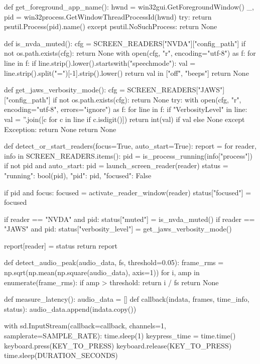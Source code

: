 \begin{pyverbatim}
def get_foreground_app_name():
    hwnd = win32gui.GetForegroundWindow()
    _, pid = win32process.GetWindowThreadProcessId(hwnd)
    try:
        return psutil.Process(pid).name()
    except psutil.NoSuchProcess:
        return None

def is_nvda_muted():
    cfg = SCREEN_READERS["NVDA"]["config_path"]
    if not os.path.exists(cfg):
        return None
    with open(cfg, "r", encoding="utf-8") as f:
        for line in f:
            if line.strip().lower().startswith("speechmode"):
                val = line.strip().split("=")[-1].strip().lower()
                return val in ["off", "beeps"]
    return None

def get_jaws_verbosity_mode():
    cfg = SCREEN_READERS["JAWS"]["config_path"]
    if not os.path.exists(cfg):
        return None
    try:
        with open(cfg, "r", encoding="utf-8", errors="ignore") as f:
            for line in f:
                if "VerbosityLevel" in line:
                    val = ''.join([c for c in line if c.isdigit()])
                    return int(val) if val else None
    except Exception:
        return None
    return None

def detect_or_start_readers(focus=True, auto_start=True):
    report = {}
    for reader, info in SCREEN_READERS.items():
        pid = is_process_running(info["process"])
        if not pid and auto_start:
            pid = launch_screen_reader(reader)
        status = {"running": bool(pid), "pid": pid, "focused": False}

        if pid and focus:
            focused = activate_reader_window(reader)
            status["focused"] = focused

        if reader == "NVDA" and pid:
            status["muted"] = is_nvda_muted()
        if reader == "JAWS" and pid:
            status["verbosity_level"] = get_jaws_verbosity_mode()

        report[reader] = status
    return report

def detect_audio_peak(audio_data, fs, threshold=0.05):
    frame_rms = np.sqrt(np.mean(np.square(audio_data), axis=1))
    for i, amp in enumerate(frame_rms):
        if amp > threshold:
            return i / fs
    return None

def measure_latency():
    audio_data = []
    def callback(indata, frames, time_info, status):
        audio_data.append(indata.copy())

    with sd.InputStream(callback=callback, channels=1, samplerate=SAMPLE_RATE):
        time.sleep(1)
        keypress_time = time.time()
        keyboard.press(KEY_TO_PRESS)
        keyboard.release(KEY_TO_PRESS)
        time.sleep(DURATION_SECONDS)


\end{pyverbatim}
